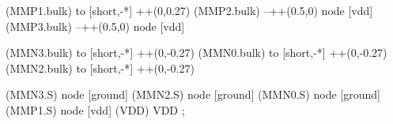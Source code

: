 \begin{circuitikz}[american]
	(MMP1.bulk) to [short,-*] ++(0,0.27)
	(MMP2.bulk) --++(0.5,0) node [vdd] {}
	(MMP3.bulk) --++(0.5,0) node [vdd] {}
	
	(MMN3.bulk) to [short,-*] ++(0,-0.27)
	(MMN0.bulk) to [short,-*] ++(0,-0.27)
	(MMN2.bulk) to [short,-*] ++(0,-0.27)	
	

	(MMN3.S) node [ground] {}
	(MMN2.S) node [ground] {}
	(MMN0.S) node [ground] {}
	(MMP1.S) node [vdd] (VDD) {VDD}
;

\end{circuitikz}
